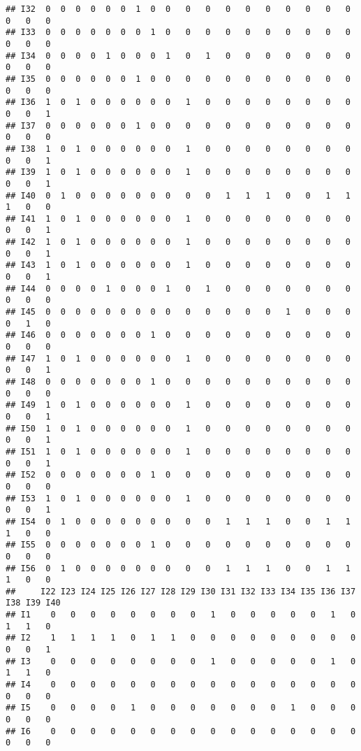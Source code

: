 \documentclass[
]{article}
\begin{document}
\begin{verbatim}
## I32  0  0  0  0  0  0  1  0  0   0   0   0   0   0   0   0   0   0   0   0   0
## I33  0  0  0  0  0  0  0  1  0   0   0   0   0   0   0   0   0   0   0   0   0
## I34  0  0  0  0  1  0  0  0  1   0   1   0   0   0   0   0   0   0   0   0   0
## I35  0  0  0  0  0  0  1  0  0   0   0   0   0   0   0   0   0   0   0   0   0
## I36  1  0  1  0  0  0  0  0  0   1   0   0   0   0   0   0   0   0   0   0   1
## I37  0  0  0  0  0  0  1  0  0   0   0   0   0   0   0   0   0   0   0   0   0
## I38  1  0  1  0  0  0  0  0  0   1   0   0   0   0   0   0   0   0   0   0   1
## I39  1  0  1  0  0  0  0  0  0   1   0   0   0   0   0   0   0   0   0   0   1
## I40  0  1  0  0  0  0  0  0  0   0   0   1   1   1   0   0   1   1   1   0   0
## I41  1  0  1  0  0  0  0  0  0   1   0   0   0   0   0   0   0   0   0   0   1
## I42  1  0  1  0  0  0  0  0  0   1   0   0   0   0   0   0   0   0   0   0   1
## I43  1  0  1  0  0  0  0  0  0   1   0   0   0   0   0   0   0   0   0   0   1
## I44  0  0  0  0  1  0  0  0  1   0   1   0   0   0   0   0   0   0   0   0   0
## I45  0  0  0  0  0  0  0  0  0   0   0   0   0   0   1   0   0   0   0   1   0
## I46  0  0  0  0  0  0  0  1  0   0   0   0   0   0   0   0   0   0   0   0   0
## I47  1  0  1  0  0  0  0  0  0   1   0   0   0   0   0   0   0   0   0   0   1
## I48  0  0  0  0  0  0  0  1  0   0   0   0   0   0   0   0   0   0   0   0   0
## I49  1  0  1  0  0  0  0  0  0   1   0   0   0   0   0   0   0   0   0   0   1
## I50  1  0  1  0  0  0  0  0  0   1   0   0   0   0   0   0   0   0   0   0   1
## I51  1  0  1  0  0  0  0  0  0   1   0   0   0   0   0   0   0   0   0   0   1
## I52  0  0  0  0  0  0  0  1  0   0   0   0   0   0   0   0   0   0   0   0   0
## I53  1  0  1  0  0  0  0  0  0   1   0   0   0   0   0   0   0   0   0   0   1
## I54  0  1  0  0  0  0  0  0  0   0   0   1   1   1   0   0   1   1   1   0   0
## I55  0  0  0  0  0  0  0  1  0   0   0   0   0   0   0   0   0   0   0   0   0
## I56  0  1  0  0  0  0  0  0  0   0   0   1   1   1   0   0   1   1   1   0   0
##     I22 I23 I24 I25 I26 I27 I28 I29 I30 I31 I32 I33 I34 I35 I36 I37 I38 I39 I40
## I1    0   0   0   0   0   0   0   0   1   0   0   0   0   0   1   0   1   1   0
## I2    1   1   1   1   0   1   1   0   0   0   0   0   0   0   0   0   0   0   1
## I3    0   0   0   0   0   0   0   0   1   0   0   0   0   0   1   0   1   1   0
## I4    0   0   0   0   0   0   0   0   0   0   0   0   0   0   0   0   0   0   0
## I5    0   0   0   0   1   0   0   0   0   0   0   0   1   0   0   0   0   0   0
## I6    0   0   0   0   0   0   0   0   0   0   0   0   0   0   0   0   0   0   0

\end{verbatim}
\end{document}
